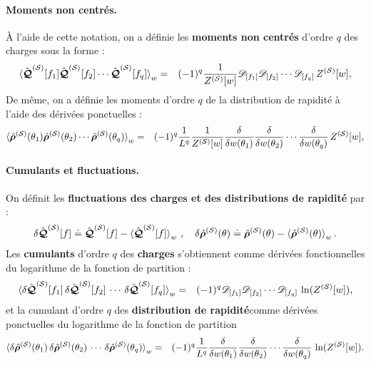 \paragraph{Moments non centrés.}
À l’aide de cette notation, on a définie les {\bf moments non centrés} d’ordre $q$ des charges sous la forme :
\begin{eqnarray}\label{chap4:eq.moment.charge.q.1}
	\braket{\hat{\bm{\mathcal{Q}}}^{(\mathcal{S})}[f_1] \hat{\bm{\mathcal{Q}}}^{(\mathcal{S})}[f_2] \cdots \hat{\bm{\mathcal{Q}}}^{(\mathcal{S})}[f_q]}_w  & = & (-1)^q \frac{1}{Z^{(\mathcal{S})}[w]}\mathscr{D}_{[f_1]} \mathscr{D}_{[f_2]} \cdots \mathscr{D}_{[f_q]}\,  Z^{(\mathcal{S})}[w], 	
\end{eqnarray}
De même, on a définie les moments d’ordre $q$ de la distribution de rapidité à l’aide des dérivées  ponctuelles :
\begin{eqnarray}\label{chap4:eq.moment.distr.q.1}
	\braket{\hat{\bm{\rho}}^{(\mathcal{S})}(\theta_1) \hat{\bm{\rho}}^{(\mathcal{S})}(\theta_2) \cdots \hat{\bm{\rho}}^{(\mathcal{S})}(\theta_q)}_w  & = & (-1)^q \frac{1}{L^q}\frac{1}{Z^{(\mathcal{S})}[w]}\frac{\delta}{\delta w(\theta_1)} \frac{\delta}{\delta w(\theta_2)} \cdots \frac{\delta}{\delta w(\theta_q)}\,  Z^{(\mathcal{S})}[w], 	
\end{eqnarray}

\paragraph{Cumulants et fluctuations.}
On définit les {\bf fluctuations des charges et des distributions de rapidité} par : 
\begin{eqnarray}
	\delta \hat{\bm{\mathcal{Q}}}^{(\mathcal{S})}[f]	 \doteq \hat{\bm{\mathcal{Q}}}^{(\mathcal{S})}[f] - \braket{\hat{\bm{\mathcal{Q}}}^{(\mathcal{S})}[f]}_w \, ,  \quad \delta \hat{\bm{\rho}}^{(\mathcal{S})}(\theta)	 \doteq \hat{\bm{\rho}}^{(\mathcal{S})}(\theta) - \braket{\hat{\bm{\rho}}^{(\mathcal{S})}(\theta)}_w.
\end{eqnarray}
Les {\bf cumulants} d’ordre $q$ des {\bf charges} s’obtiennent comme dérivées fonctionnelles du logarithme de la fonction de partition :
\begin{eqnarray}\label{chap4:eq.cumulant.charge.q.1}
	\braket{\delta\hat{\bm{\mathcal{Q}}}^{(\mathcal{S})}[f_1] \, \delta\hat{\bm{\mathcal{Q}}}^{(\mathcal{S})}[f_2] \, \cdots \,  \delta\hat{\bm{\mathcal{Q}}}^{(\mathcal{S})}[f_q]}_w  & = & (-1)^q \mathscr{D}_{[f_1]} \mathscr{D}_{[f_2]} \cdots \mathscr{D}_{[f_q]}\,  \ln(Z^{(\mathcal{S})}[w]), 	
\end{eqnarray}
et la cumulant d'ordre $q$ des {\bf distribution de rapidité}comme dérivées ponctuelles du logarithme de la fonction de partition 
\begin{eqnarray}\label{chap4:eq.cumulant.distr.q.1}
	\braket{\delta \hat{\bm{\rho}}^{(\mathcal{S})}(\theta_1) \, \delta\hat{\bm{\rho}}^{(\mathcal{S})}(\theta_2) \, \cdots \,  \delta\hat{\bm{\rho}}^{(\mathcal{S})}(\theta_q)}_w  & = & (-1)^q \frac{1}{L^q} \frac{\delta}{\delta w(\theta_1)} \frac{\delta}{\delta w(\theta_2)} \cdots \frac{\delta}{\delta w(\theta_q)}\,  \ln (Z^{(\mathcal{S})}[w]). 	
\end{eqnarray}


